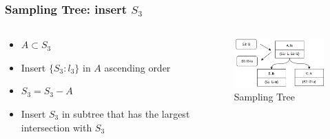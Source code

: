 \documentclass[notheorems, aspectratio=54]{beamer}
\begin{document}
\begin{frame}
    \frametitle{Sampling Tree: insert $S_3$}
    \begin{columns}
        \begin{column}{0.48\textwidth}
            \begin{itemize}
                \item $A \subset S_3$
                \item Insert $\{S_3: l_3\}$ in $A$ ascending order
                \item $S_3 = S_3 - A$
                \item Insert $S_3$ in subtree that has the largest intersection with $S_3$
            \end{itemize}
        \end{column}
        \begin{column}{0.48\textwidth}
            \begin{figure}
                \centering
                \includegraphics[width=6cm]{global_img_dir/insert1.png}
                \caption{Sampling Tree}
            \end{figure}
        \end{column}
    \end{columns}
\end{frame}
\end{document}
